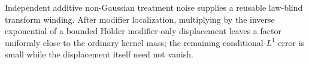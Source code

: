 Independent additive non-Gaussian treatment noise supplies a reusable law-blind transform winding.  After modifier localization, multiplying by the inverse exponential of a bounded Hölder modifier-only displacement leaves a factor uniformly close to the ordinary kernel mass; the remaining conditional-\(L^1\) error is small while the displacement itself need not vanish.